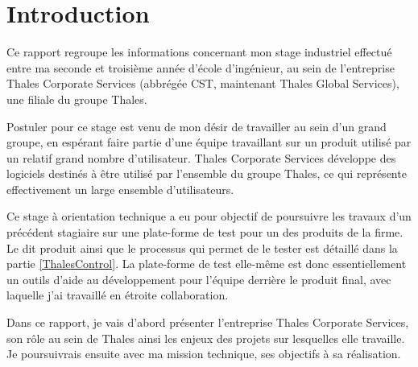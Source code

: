\section{Introduction}

Ce rapport regroupe les informations concernant mon stage industriel effectué
entre ma seconde et troisième année d'école d'ingénieur, au sein de l'entreprise
Thales Corporate Services (abbrégée CST, maintenant Thales Global Services), une
filiale du groupe Thales.

Postuler pour ce stage est venu de mon désir de travailler au sein d'un grand 
groupe, en espérant faire partie d'une équipe travaillant sur un produit utilisé
par un relatif grand nombre d'utilisateur. Thales Corporate Services développe 
des logiciels destinés à être utilisé par l'ensemble du groupe Thales, ce qui
représente effectivement un large ensemble d'utilisateurs.

Ce stage à orientation technique a eu pour objectif de poursuivre les travaux 
d'un précédent stagiaire sur une plate-forme de test pour un des produits de la
firme. Le dit produit ainsi que le processus qui permet de le tester est 
détaillé dans la partie \ref{ThalesControl}. La plate-forme de test elle-même 
est donc essentiellement un outils d'aide au développement pour l'équipe 
derrière le produit final, avec laquelle j'ai travaillé en étroite 
collaboration.

Dans ce rapport, je vais d'abord présenter l'entreprise Thales Corporate 
Services, son rôle au sein de Thales ainsi les enjeux des projets sur lesquelles
elle travaille. Je poursuivrais ensuite avec ma mission technique, ses 
objectifs à sa réalisation.